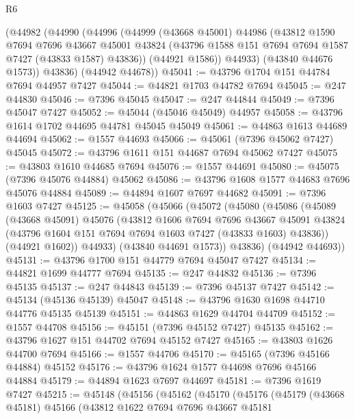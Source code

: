 \begin{lexlean}{R6}
\begin{coremodule}
      (@44982
        (@44990
          (@44996
            (@44999
              (@43668 @45001)
              @44986
              (@43812
                @1590
                @7694
                @7696
                @43667
                @45001
                @43824
                (@43796 @1588 @151 @7694 @7694 @1587 @7427 (@43833 @1587) @43836))
              (@44921 @1586))
            @44933)
          (@43840 @44676 @1573))
        @43836)
      (@44942 @44678))
@45041 := @43796 @1704 @151 @44784 @7694 @44957 @7427
@45044 := @44821 @1703 @44782 @7694
@45045 := @247 @44830
@45046 := @7396 @45045
@45047 := @247 @44844
@45049 := @7396 @45047 @7427
@45052 := @45044 (@45046 @45049) @44957
@45058 := @43796 @1614 @1702 @44695 @44781 @45045 @45049
@45061 := @44863 @1613 @44689 @44694
@45062 := @1557 @44693
@45066 := @45061 (@7396 @45062 @7427) @45045
@45072 := @43796 @1611 @151 @44687 @7694 @45062 @7427
@45075 := @43803 @1610 @44685 @7694
@45076 := @1557 @44691
@45080 := @45075 (@7396 @45076 @44884) @45062
@45086 := @43796 @1608 @1577 @44683 @7696 @45076 @44884
@45089 := @44894 @1607 @7697 @44682
@45091 := @7396 @1603 @7427
@45125 := @45058
    (@45066
      (@45072
        (@45080
          (@45086
            (@45089
              (@43668 @45091)
              @45076
              (@43812
                @1606
                @7694
                @7696
                @43667
                @45091
                @43824
                (@43796 @1604 @151 @7694 @7694 @1603 @7427 (@43833 @1603) @43836))
              (@44921 @1602))
            @44933)
          (@43840 @44691 @1573))
        @43836)
      (@44942 @44693))
@45131 := @43796 @1700 @151 @44779 @7694 @45047 @7427
@45134 := @44821 @1699 @44777 @7694
@45135 := @247 @44832
@45136 := @7396 @45135
@45137 := @247 @44843
@45139 := @7396 @45137 @7427
@45142 := @45134 (@45136 @45139) @45047
@45148 := @43796 @1630 @1698 @44710 @44776 @45135 @45139
@45151 := @44863 @1629 @44704 @44709
@45152 := @1557 @44708
@45156 := @45151 (@7396 @45152 @7427) @45135
@45162 := @43796 @1627 @151 @44702 @7694 @45152 @7427
@45165 := @43803 @1626 @44700 @7694
@45166 := @1557 @44706
@45170 := @45165 (@7396 @45166 @44884) @45152
@45176 := @43796 @1624 @1577 @44698 @7696 @45166 @44884
@45179 := @44894 @1623 @7697 @44697
@45181 := @7396 @1619 @7427
@45215 := @45148
    (@45156
      (@45162
        (@45170
          (@45176
            (@45179
              (@43668 @45181)
              @45166
              (@43812
                @1622
                @7694
                @7696
                @43667
                @45181

\end{coremodule}
\end{lexlean}
